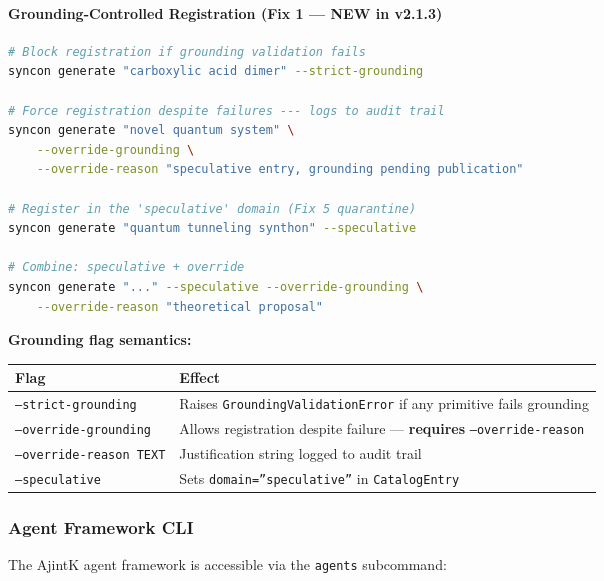 \documentclass[12pt,a4paper]{article}
\begin{document}
\paragraph{Grounding-Controlled Registration (Fix 1 --- NEW in v2.1.3)}

\begin{lstlisting}[language=bash]
# Block registration if grounding validation fails
syncon generate "carboxylic acid dimer" --strict-grounding

# Force registration despite failures --- logs to audit trail
syncon generate "novel quantum system" \
    --override-grounding \
    --override-reason "speculative entry, grounding pending publication"

# Register in the 'speculative' domain (Fix 5 quarantine)
syncon generate "quantum tunneling synthon" --speculative

# Combine: speculative + override
syncon generate "..." --speculative --override-grounding \
    --override-reason "theoretical proposal"
\end{lstlisting}

\textbf{Grounding flag semantics:}

\begin{table}[htbp]
\centering
\small
{}
\begin{tabularx}{\textwidth}{>{\centering\arraybackslash}X >{\centering\arraybackslash}X}
\toprule
\rowcolor{gray!25}\textbf{Flag} & \textbf{Effect} \\
\midrule
\rowcolors{1}{white}{gray!10}
\texttt{--strict-grounding} & Raises \texttt{GroundingValidationError} if any primitive fails grounding \\
\texttt{--override-grounding} & Allows registration despite failure --- \textbf{requires} \texttt{--override-reason} \\
\texttt{--override-reason TEXT} & Justification string logged to audit trail \\
\texttt{--speculative} & Sets \texttt{domain=''speculative''} in \texttt{CatalogEntry} \\
\bottomrule
\end{tabularx}
\end{table}

\subsubsection{Agent Framework CLI}

The AjintK agent framework is accessible via the \texttt{agents} subcommand:
\end{document}

